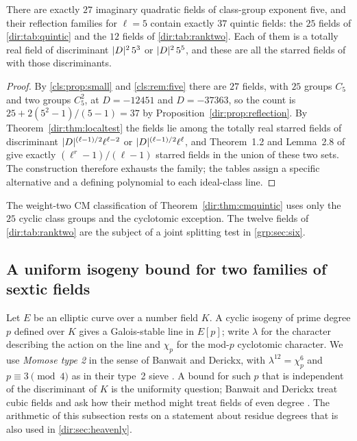 \begin{corollary}
\label{dir:cor:reflected37}
There are exactly $27$ imaginary quadratic fields of class-group exponent five, and
their reflection families for $\ell=5$ contain exactly $37$ quintic fields: the $25$
fields of \cref{dir:tab:quintic} and the $12$ fields of \cref{dir:tab:ranktwo}. Each of
them is a totally real field of discriminant $\lvert D\rvert^2\,5^3$ or $\lvert D\rvert^2\,5^5$, and
these are all the starred fields of \cite{CohenRubinsteinSalzedoThorne2015Identities}
with those discriminants.
\end{corollary}

\begin{proof}
By \cref{cls:prop:small} and \cref{cls:rem:five} there are $27$ fields, with $25$ groups
$C_5$ and two groups $C_5^2$, at $D=-12451$ and $D=-37363$, so the count is
$25+2(5^2-1)/(5-1)=37$ by Proposition~\ref{dir:prop:reflection}. By Theorem~\ref{dir:thm:localtest} the fields lie among the
totally real starred fields of discriminant $\lvert D\rvert^{(\ell-1)/2}\ell^{\ell-2}$ or
$\lvert D\rvert^{(\ell-1)/2}\ell^{\ell}$, and Theorem~1.2 and Lemma~2.8 of
\cite{CohenRubinsteinSalzedoThorne2015Identities} give exactly
$(\ell^r-1)/(\ell-1)$ starred fields in the union of these two sets. The construction
therefore exhausts the family; the tables assign a specific alternative and a defining
polynomial to each ideal-class line.
\end{proof}

The weight-two CM classification of Theorem~\ref{dir:thm:cmquintic} uses only the $25$ cyclic
class groups and the cyclotomic exception. The twelve fields of
\cref{dir:tab:ranktwo} are the subject of a joint splitting test in \cref{grp:sec:six}.

\subsection{A uniform isogeny bound for two families of sextic fields}
\label{dir:sec:isogeny}

Let $E$ be an elliptic curve over a number field $K$. A cyclic isogeny of prime degree
$p$ defined over $K$ gives a Galois-stable line in $E[p]$; write $\lambda$ for the
character describing the action on the line and $\chi_p$ for the mod-$p$ cyclotomic
character. We use \emph{Momose type 2} in the sense of Banwait and Derickx, with
$\lambda^{12}=\chi_p^6$ and $p\equiv3\pmod4$ as in their type~2 sieve
\cite{BanwaitDerickx2025Explicit}. A bound for such $p$ that is independent of the
discriminant of $K$ is the uniformity question; Banwait and Derickx treat cubic fields
and ask how their method might treat fields of even degree
\cite{BanwaitDerickx2023Towards}. The arithmetic of this subsection rests on a statement
about residue degrees that is also used in \cref{dir:sec:heavenly}.

